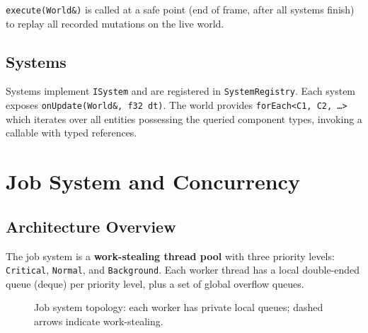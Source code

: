 \documentclass[12pt, a4paper]{report}
\theoremstyle{definition}
\theoremstyle{remark}
\begin{document}
\texttt{execute(World\&)} is called at a safe point (end of frame,
after all systems finish) to replay all recorded mutations on the live world.

\section{Systems}

Systems implement \texttt{ISystem} and are registered in
\texttt{SystemRegistry}. Each system exposes \texttt{onUpdate(World\&, f32 dt)}.
The world provides \texttt{forEach<C1, C2, \ldots>} which iterates over all
entities possessing the queried component types, invoking a callable
with typed references.

\chapter{Job System and Concurrency}

\section{Architecture Overview}

The job system is a \textbf{work-stealing thread pool} with three
priority levels: \texttt{Critical}, \texttt{Normal}, and \texttt{Background}.
Each worker thread has a local double-ended queue (deque) per priority level,
plus a set of global overflow queues.

\begin{figure}[H]
\centering
{}
\caption{Job system topology: each worker has private local queues; dashed arrows indicate work-stealing.}
\end{figure}
\end{document}
